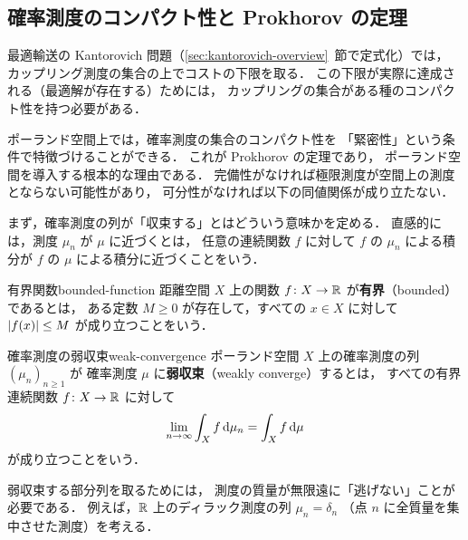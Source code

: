 \subsection{確率測度のコンパクト性と Prokhorov の定理}
\label{subsec:prokhorov}

最適輸送の Kantorovich 問題（\ref{sec:kantorovich-overview}~節で定式化）では，
カップリング測度の集合の上でコストの下限を取る．
この下限が実際に達成される（最適解が存在する）ためには，
カップリングの集合がある種のコンパクト性を持つ必要がある．

ポーランド空間上では，確率測度の集合のコンパクト性を
「緊密性」という条件で特徴づけることができる．
これが Prokhorov の定理であり，
ポーランド空間を導入する根本的な理由である．
完備性がなければ極限測度が空間上の測度とならない可能性があり，
可分性がなければ以下の同値関係が成り立たない．

まず，確率測度の列が「収束する」とはどういう意味かを定める．
直感的には，測度 $\mu_n$ が $\mu$ に近づくとは，
任意の連続関数 $f$ に対して $f$ の $\mu_n$ による積分が $f$ の $\mu$ による積分に近づくことをいう．

\begin{definition}{有界関数}{bounded-function}
  距離空間 $X$ 上の関数 $f \colon X \to \mathbb{R}$ が\textbf{有界}（bounded）であるとは，
  ある定数 $M \geq 0$ が存在して，すべての $x \in X$ に対して $\lvert f(x) \rvert \leq M$
  が成り立つことをいう．
\end{definition}

\begin{definition}{確率測度の弱収束}{weak-convergence}
  ポーランド空間 $X$ 上の確率測度の列 $(\mu_n)_{n \geq 1}$ が
  確率測度 $\mu$ に\textbf{弱収束}（weakly converge）するとは，
  すべての有界連続関数 $f \colon X \to \mathbb{R}$ に対して
  \[
    \lim_{n \to \infty} \int_X f \, \mathrm{d}\mu_n = \int_X f \, \mathrm{d}\mu
  \]
  が成り立つことをいう．
\end{definition}

弱収束する部分列を取るためには，
測度の質量が無限遠に「逃げない」ことが必要である．
例えば，$\mathbb{R}$ 上のディラック測度の列 $\mu_n = \delta_n$
（点 $n$ に全質量を集中させた測度）を考える．

